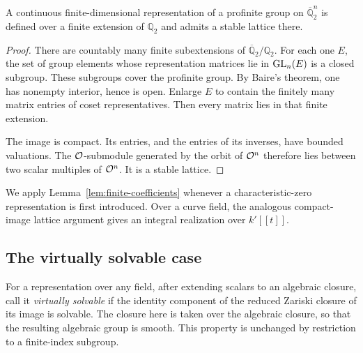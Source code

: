 \begin{lemma}\label{lem:finite-coefficients}
A continuous finite-dimensional representation of a profinite
group on \(\overline{\mathbb Q}_2^n\) is defined over a finite
extension of \(\mathbb Q_2\) and admits a stable lattice there.
\end{lemma}
\begin{proof}
There are countably many finite subextensions of
\(\overline{\mathbb Q}_2/\mathbb Q_2\). For each one \(E\),
the set of group elements whose representation matrices
lie in \(\operatorname{GL}_n(E)\) is a closed subgroup. These subgroups
cover the profinite group. By Baire's theorem, one has
nonempty interior, hence is open. Enlarge \(E\) to contain
the finitely many matrix entries of coset representatives.
Then every matrix lies in that finite extension.

The image is compact. Its entries, and the entries of its
inverses, have bounded valuations. The \(\mathcal O\)-submodule
generated by the orbit of \(\mathcal O^n\) therefore lies between
two scalar multiples of \(\mathcal O^n\). It is a stable lattice.
\end{proof}

We apply Lemma~\ref{lem:finite-coefficients} whenever a
characteristic-zero representation is first introduced.
Over a curve field, the analogous compact-image lattice
argument gives an integral realization over \(k'[[t]]\).

\subsection{The virtually solvable case}

For a representation over any field, after extending scalars
to an algebraic closure, call it \emph{virtually solvable}
if the identity component of the reduced Zariski closure of its image
is solvable. The closure here is taken over the algebraic closure,
so that the resulting algebraic group is smooth. This property is unchanged by restriction to
a finite-index subgroup.

